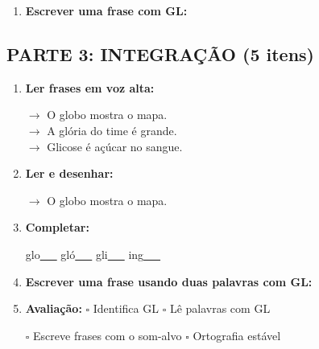 \begin{exercicio}
\begin{enumerate}[resume]
  \item \textbf{Escrever uma frase com GL:}
  \begin{center}
  \underline{\hspace{12cm}}
  \end{center}

\end{enumerate}

\subsection*{PARTE 3: INTEGRAÇÃO (5 itens)}

\begin{enumerate}[resume]

  \item \textbf{Ler frases em voz alta:}
  \begin{center}
  $\rightarrow$ O globo mostra o mapa.\\
  $\rightarrow$ A glória do time é grande.\\
  $\rightarrow$ Glicose é açúcar no sangue.\\
  \end{center}

  \item \textbf{Ler e desenhar:}
  \begin{center}
  $\rightarrow$ O globo mostra o mapa.
  \end{center}
  \begin{center}
  \end{center}

  \item \textbf{Completar:}
  \begin{center}
  glo\underline{~~~} \quad gló\underline{~~~} \quad gli\underline{~~~} \quad ing\underline{~~~}
  \end{center}

  \item \textbf{Escrever uma frase usando duas palavras com GL:}
  \begin{center}
  \underline{\hspace{12cm}}
  \end{center}

  \item \textbf{Avaliação:} $\square$ Identifica GL \quad $\square$ Lê palavras com GL
  \begin{center}
  $\square$ Escreve frases com o som-alvo \quad $\square$ Ortografia estável
  \end{center}


\end{enumerate}
\end{exercicio}
